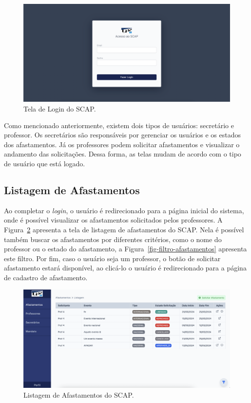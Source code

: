 \begin{figure}[h!]
    \centering
    \includegraphics[width=\textwidth]{figuras/prints-app/fig-login.png}
    \caption{Tela de Login do SCAP.}
    \label{fig-login}
\end{figure}

Como mencionado anteriormente, existem dois tipos de usuários: secretário e professor. 
Os secretários são responsáveis por gerenciar os usuários e os estados dos afastamentos.
Já os professores podem solicitar afastamentos e visualizar o andamento das solicitações.
Dessa forma, as telas mudam de acordo com o tipo de usuário que está logado.


\subsection{Listagem de Afastamentos}
\label{subsec-projeto-afastamentos}

Ao completar o \textit{login}, o usuário é redirecionado para a página inicial do sistema, onde é possível
visualizar os afastamentos solicitados pelos professores. A Figura~\ref{fig-listagem-afastamentos} apresenta a tela de listagem de afastamentos
do SCAP. Nela é possível também buscar os afastamentos por diferentes critérios, como o nome do professor ou o estado do afastamento,
a Figura~\ref{fig-filtro-afastamentos} apresenta este filtro. Por fim, caso o usuário seja um professor,
o botão de solicitar afastamento estará disponível, ao clicá-lo o usuário é redirecionado para a página de cadastro de afastamento.

\begin{figure}[h!]
    \centering
    \includegraphics[width=\textwidth]{figuras/prints-app/fig-lista-afastamento.png}
    \caption{Listagem de Afastamentos do SCAP.}
    \label{fig-listagem-afastamentos}
\end{figure}

